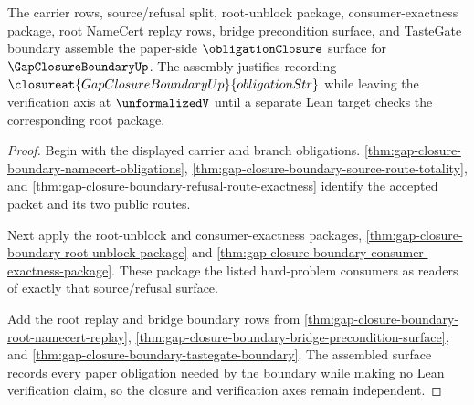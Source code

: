 \begin{theorem}
\label{thm:gap-closure-boundary-obligation-status-assembly}
The carrier rows, source/refusal split, root-unblock package, consumer-exactness package, root NameCert replay rows, bridge precondition surface, and TasteGate boundary assemble the paper-side $\obligationClosure$ surface for $\GapClosureBoundaryUp$. The assembly justifies recording $\closureat{GapClosureBoundaryUp}{obligationStr}$ while leaving the verification axis at $\unformalizedV$ until a separate Lean target checks the corresponding root package.
\end{theorem}
\begin{proof}
Begin with the displayed carrier and branch obligations. \autoref{thm:gap-closure-boundary-namecert-obligations}, \autoref{thm:gap-closure-boundary-source-route-totality}, and \autoref{thm:gap-closure-boundary-refusal-route-exactness} identify the accepted packet and its two public routes.

Next apply the root-unblock and consumer-exactness packages, \autoref{thm:gap-closure-boundary-root-unblock-package} and \autoref{thm:gap-closure-boundary-consumer-exactness-package}. These package the listed hard-problem consumers as readers of exactly that source/refusal surface.

Add the root replay and bridge boundary rows from \autoref{thm:gap-closure-boundary-root-namecert-replay}, \autoref{thm:gap-closure-boundary-bridge-precondition-surface}, and \autoref{thm:gap-closure-boundary-tastegate-boundary}. The assembled surface records every paper obligation needed by the boundary while making no Lean verification claim, so the closure and verification axes remain independent.
\end{proof}
